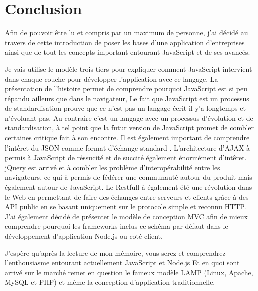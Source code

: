 \section{Conclusion }
\label{ch:cintro}

Afin de pouvoir être lu et compris par un maximum de personne, j'ai décidé au travers de cette introduction de poser les bases d'une application d'entreprises ainsi que de tout les concepts important entourant JavaScript et de ses avancés.

Je vais utilise le modèle trois-tiers pour expliquer comment JavaScript intervient dans chaque couche pour développer l'application avec ce langage. La présentation de l'histoire permet de comprendre pourquoi JavaScript est si peu répandu ailleurs que dans le navigateur, Le fait que JavaScript est un processus de standardisation prouve que ce n'est pas un langage écrit il y'a longtemps et n'évoluant pas. Au contraire c'est un langage avec un processus d'évolution et de standardisation, à tel point que la futur version de JavaScript promet de combler certaines critique fait à son encontre. Il est également important de comprendre l'intêret du JSON comme format d'échange standard . L'architecture d'AJAX à permis à JavaScript de réssucité et de succité également énormément d'intêret. jQuery est arrivé et à combler les problème d'interopérabilité entre les navigateurs, ce qui à permis de fédérer une communauté autour du produit mais également autour de JavaScript. Le Restfull à également été une révolution dans le Web en permettant de faire des échanges entre serveurs et clients grâce à des API public en se basant uniquement sur le protocole simple et reconnu HTTP. J'ai également décidé de présenter le modèle de conception MVC afin de mieux comprendre pourquoi les frameworks inclus ce schéma par défaut dans le développement d'application Node.js ou coté client.

J'espère qu'après la lecture de mon mémoire, vous serez et comprendrez l'enthousiasme entourant actuellement JavaScript et Node.js Et en quoi sont arrivé sur le marché remet en question le fameux modèle LAMP (Linux, Apache, MySQL et PHP) et même la conception d'application traditionnelle.

